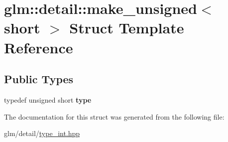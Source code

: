 \hypertarget{structglm_1_1detail_1_1make__unsigned_3_01short_01_4}{\section{glm\-:\-:detail\-:\-:make\-\_\-unsigned$<$ short $>$ Struct Template Reference}
\label{structglm_1_1detail_1_1make__unsigned_3_01short_01_4}
}
\subsection*{Public Types}
\begin{DoxyCompactItemize}
\item 
\hypertarget{structglm_1_1detail_1_1make__unsigned_3_01short_01_4_a58861091aca3a68acc085131cc6fefa4}{typedef unsigned short {\bfseries type}}\label{structglm_1_1detail_1_1make__unsigned_3_01short_01_4_a58861091aca3a68acc085131cc6fefa4}

\end{DoxyCompactItemize}


The documentation for this struct was generated from the following file\-:\begin{DoxyCompactItemize}
\item 
glm/detail/\hyperlink{type__int_8hpp}{type\-\_\-int.\-hpp}\end{DoxyCompactItemize}

